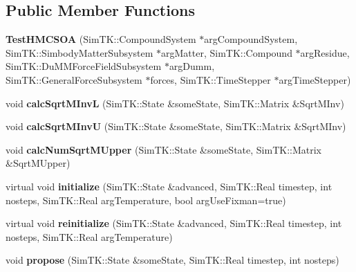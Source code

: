 \subsection*{Public Member Functions}
\begin{DoxyCompactItemize}
\item 
{\bfseries Test\+H\+M\+C\+S\+OA} (Sim\+T\+K\+::\+Compound\+System $\ast$arg\+Compound\+System, Sim\+T\+K\+::\+Simbody\+Matter\+Subsystem $\ast$arg\+Matter, Sim\+T\+K\+::\+Compound $\ast$arg\+Residue, Sim\+T\+K\+::\+Du\+M\+M\+Force\+Field\+Subsystem $\ast$arg\+Dumm, Sim\+T\+K\+::\+General\+Force\+Subsystem $\ast$forces, Sim\+T\+K\+::\+Time\+Stepper $\ast$arg\+Time\+Stepper)\hypertarget{classTestHMCSOA_a2364faa39acdfbaf2c40b0029f8034ad}{}\label{classTestHMCSOA_a2364faa39acdfbaf2c40b0029f8034ad}

\item 
void {\bfseries calc\+Sqrt\+M\+InvL} (Sim\+T\+K\+::\+State \&some\+State, Sim\+T\+K\+::\+Matrix \&Sqrt\+M\+Inv)\hypertarget{classTestHMCSOA_a00b83f6d574017a27585bda53ebd2b85}{}\label{classTestHMCSOA_a00b83f6d574017a27585bda53ebd2b85}

\item 
void {\bfseries calc\+Sqrt\+M\+InvU} (Sim\+T\+K\+::\+State \&some\+State, Sim\+T\+K\+::\+Matrix \&Sqrt\+M\+Inv)\hypertarget{classTestHMCSOA_a9f33ac3396c3a50ae4d117128eb3c330}{}\label{classTestHMCSOA_a9f33ac3396c3a50ae4d117128eb3c330}

\item 
void {\bfseries calc\+Num\+Sqrt\+M\+Upper} (Sim\+T\+K\+::\+State \&some\+State, Sim\+T\+K\+::\+Matrix \&Sqrt\+M\+Upper)\hypertarget{classTestHMCSOA_acc16eb3051214df52691bdef5f8a54ea}{}\label{classTestHMCSOA_acc16eb3051214df52691bdef5f8a54ea}

\item 
virtual void {\bfseries initialize} (Sim\+T\+K\+::\+State \&advanced, Sim\+T\+K\+::\+Real timestep, int nosteps, Sim\+T\+K\+::\+Real arg\+Temperature, bool arg\+Use\+Fixman=true)\hypertarget{classTestHMCSOA_a8bdb352bb5fc093ba889dcb1c8dff1a6}{}\label{classTestHMCSOA_a8bdb352bb5fc093ba889dcb1c8dff1a6}

\item 
virtual void {\bfseries reinitialize} (Sim\+T\+K\+::\+State \&advanced, Sim\+T\+K\+::\+Real timestep, int nosteps, Sim\+T\+K\+::\+Real arg\+Temperature)\hypertarget{classTestHMCSOA_a7a483e9d2e14533e7bf24ea45d2424f7}{}\label{classTestHMCSOA_a7a483e9d2e14533e7bf24ea45d2424f7}

\item 
void {\bfseries propose} (Sim\+T\+K\+::\+State \&some\+State, Sim\+T\+K\+::\+Real timestep, int nosteps)\hypertarget{classTestHMCSOA_a50e579ed181768b081a68590701402d0}{}\label{classTestHMCSOA_a50e579ed181768b081a68590701402d0}


\end{DoxyCompactItemize}
